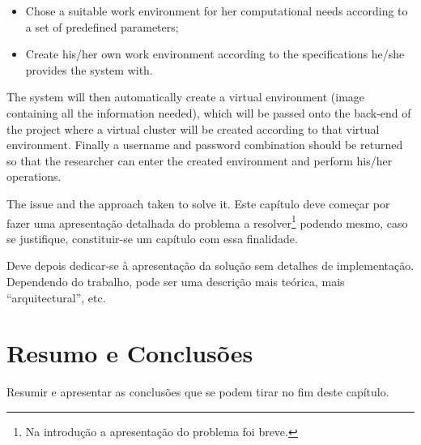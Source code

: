 \begin{itemize}
	\item Chose a suitable work environment for her computational needs according to a set of predefined parameters;
	\item Create his/her own work environment according to the specifications he/she provides the system with.
\end{itemize}

The system will then automatically create a virtual environment (image containing all the information needed), which will be passed onto the back-end of the project where a virtual cluster will be created according to that virtual environment.
Finally a username and password combination should be returned so that the researcher can enter the created environment and perform his/her operations.

The issue and the approach taken to solve it.
Este capítulo deve começar por fazer uma apresentação detalhada do
problema a resolver\footnote{Na introdução a apresentação do
  problema foi breve.} podendo mesmo, caso se justifique,
constituir-se um capítulo com essa finalidade.

Deve depois dedicar-se à apresentação da solução sem detalhes de
implementação. 
Dependendo do trabalho, pode ser uma descrição mais teórica, mais
``arquitectural'', etc.

\section{Resumo e Conclusões}

Resumir e apresentar as conclusões que se podem tirar no fim deste
capítulo.
